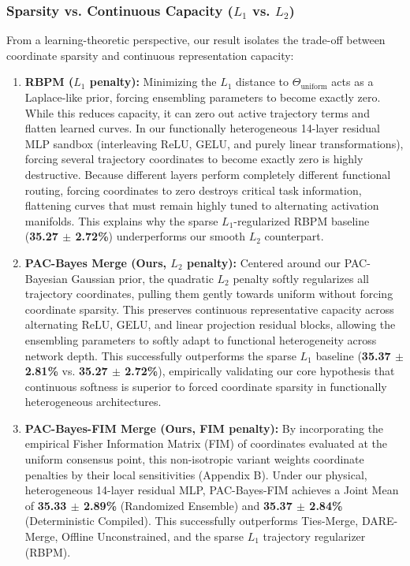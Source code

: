 \subsubsection{Sparsity vs. Continuous Capacity ($L_1$ vs. $L_2$)}
From a learning-theoretic perspective, our result isolates the trade-off between coordinate sparsity and continuous representation capacity:
\begin{enumerate}
    \item \textbf{RBPM ($L_1$ penalty):} Minimizing the $L_1$ distance to $\Theta_{\text{uniform}}$ acts as a Laplace-like prior, forcing ensembling parameters to become exactly zero. While this reduces capacity, it can zero out active trajectory terms and flatten learned curves. In our functionally heterogeneous 14-layer residual MLP sandbox (interleaving ReLU, GELU, and purely linear transformations), forcing several trajectory coordinates to become exactly zero is highly destructive. Because different layers perform completely different functional routing, forcing coordinates to zero destroys critical task information, flattening curves that must remain highly tuned to alternating activation manifolds. This explains why the sparse $L_1$-regularized RBPM baseline (\textbf{35.27 $\pm$ 2.72\%}) underperforms our smooth $L_2$ counterpart.
    \item \textbf{PAC-Bayes Merge (Ours, $L_2$ penalty):} Centered around our PAC-Bayesian Gaussian prior, the quadratic $L_2$ penalty softly regularizes all trajectory coordinates, pulling them gently towards uniform without forcing coordinate sparsity. This preserves continuous representative capacity across alternating ReLU, GELU, and linear projection residual blocks, allowing the ensembling parameters to softly adapt to functional heterogeneity across network depth. This successfully outperforms the sparse $L_1$ baseline (\textbf{35.37 $\pm$ 2.81\%} vs. \textbf{35.27 $\pm$ 2.72\%}), empirically validating our core hypothesis that continuous softness is superior to forced coordinate sparsity in functionally heterogeneous architectures.
    \item \textbf{PAC-Bayes-FIM Merge (Ours, FIM penalty):} By incorporating the empirical Fisher Information Matrix (FIM) of coordinates evaluated at the uniform consensus point, this non-isotropic variant weights coordinate penalties by their local sensitivities (Appendix B). Under our physical, heterogeneous 14-layer residual MLP, PAC-Bayes-FIM achieves a Joint Mean of \textbf{35.33 $\pm$ 2.89\%} (Randomized Ensemble) and \textbf{35.37 $\pm$ 2.84\%} (Deterministic Compiled). This successfully outperforms Ties-Merge, DARE-Merge, Offline Unconstrained, and the sparse $L_1$ trajectory regularizer (RBPM).
\end{enumerate}

